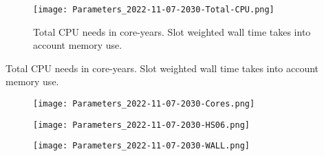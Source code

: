 \documentclass[12pt]{article}
\begin{document}
\begin{figure}[h]
\centering\texttt{[image: Parameters\_2022-11-07-2030-Total-CPU.png]}\label{Total-CPU}
\caption{Total CPU needs in core-years. Slot weighted wall time takes into account memory use.}
\end{figure}
\begin{table}[h]
\centering{}\label{Total-CPU
}
\caption{Total CPU needs in core-years. Slot weighted wall time takes into account memory use.}
\end{table}
\begin{figure}[h]
\centering\texttt{[image: Parameters\_2022-11-07-2030-Cores.png]}\label{Cores}
\caption{}
\end{figure}
\begin{table}[h]
\centering{}\label{Cores
}
\caption{}
\end{table}
\begin{figure}[h]
\centering\texttt{[image: Parameters\_2022-11-07-2030-HS06.png]}\label{HS06}
\caption{}
\end{figure}
\begin{table}[h]
\centering{}\label{HS06
}
\caption{}
\end{table}
\begin{figure}[h]
\centering\texttt{[image: Parameters\_2022-11-07-2030-WALL.png]}\label{WALL}
\caption{}
\end{figure}
\begin{table}[h]
\centering{}\label{WALL
}
\caption{}
\end{table}
\end{document}
